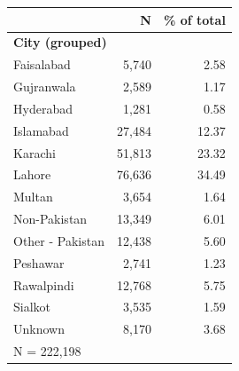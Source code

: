 \begin{tabular}{lrr}


\toprule


 & N & \% of total \\


\midrule


\multicolumn{3}{l}{\textbf{City (grouped)}}\\ 
\midrule
Faisalabad          &       5,740&        2.58\\
Gujranwala          &       2,589&        1.17\\
Hyderabad           &       1,281&        0.58\\
Islamabad           &      27,484&       12.37\\
Karachi             &      51,813&       23.32\\
Lahore              &      76,636&       34.49\\
Multan              &       3,654&        1.64\\
Non-Pakistan        &      13,349&        6.01\\
Other - Pakistan    &      12,438&        5.60\\
Peshawar            &       2,741&        1.23\\
Rawalpindi          &      12,768&        5.75\\
Sialkot             &       3,535&        1.59\\
Unknown             &       8,170&        3.68\\
\midrule


\multicolumn{3}{l}{\footnotesize N =      222,198}\\


\bottomrule


\end{tabular}


